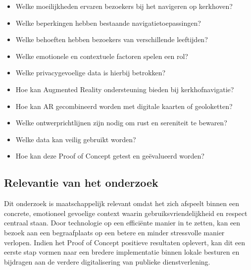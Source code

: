 \begin{itemize}
    \item Welke moeilijkheden ervaren bezoekers bij het navigeren op kerkhoven?
    \item Welke beperkingen hebben bestaande navigatietoepassingen?
    \item Welke behoeften hebben bezoekers van verschillende leeftijden?
    \item Welke emotionele en contextuele factoren spelen een rol?
    \item Welke privacygevoelige data is hierbij betrokken?
    \item Hoe kan Augmented Reality ondersteuning bieden bij kerkhofnavigatie?
    \item Hoe kan AR gecombineerd worden met digitale kaarten of geoloketten?
    \item Welke ontwerprichtlijnen zijn nodig om rust en sereniteit te bewaren?
    \item Welke data kan veilig gebruikt worden?
    \item Hoe kan deze Proof of Concept getest en geëvalueerd worden?
\end{itemize}


\subsection{Relevantie van het onderzoek}
Dit onderzoek is maatschappelijk relevant omdat het zich afspeelt binnen een concrete, emotioneel gevoelige context waarin gebruiksvriendelijkheid en respect centraal staan. Door technologie op een efficiënte manier in te zetten, kan een bezoek aan een begraafplaats op een betere en minder stressvolle manier verlopen. Indien het Proof of Concept positieve resultaten oplevert, kan dit een eerste stap vormen naar een bredere implementatie binnen lokale besturen en bijdragen aan de verdere digitalisering van publieke dienstverlening.

\section{}%
\label{sec:opzet-bachelorproef}



